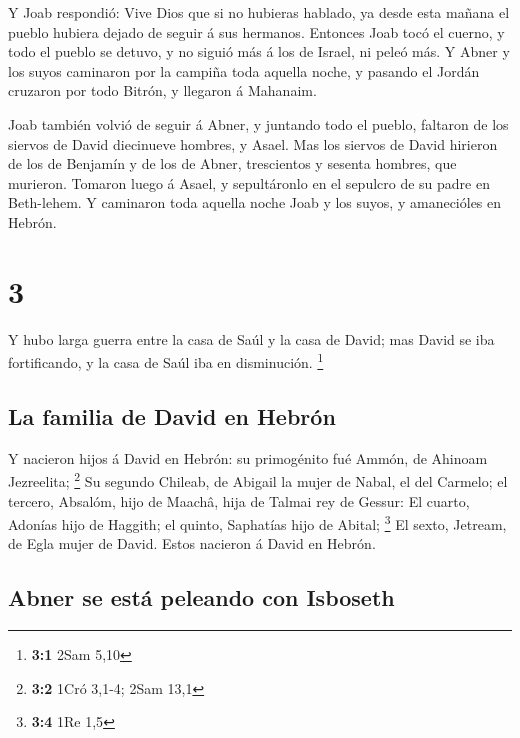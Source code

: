  Y Joab respondió: Vive Dios que si no hubieras hablado,
ya desde esta mañana el pueblo hubiera dejado de seguir á sus hermanos.
 Entonces Joab tocó el cuerno, y todo el pueblo se
detuvo, y no siguió más á los de Israel, ni peleó más.  Y
Abner y los suyos caminaron por la campiña toda aquella noche, y pasando
el Jordán cruzaron por todo Bitrón, y llegaron á Mahanaim.

 Joab también volvió de seguir á Abner, y juntando todo
el pueblo, faltaron de los siervos de David diecinueve hombres, y Asael.
 Mas los siervos de David hirieron de los de Benjamín y
de los de Abner, trescientos y sesenta hombres, que murieron. Tomaron
luego á Asael, y sepultáronlo en el sepulcro de su padre en Beth-lehem.
 Y caminaron toda aquella noche Joab y los suyos, y
amanecióles en Hebrón.

\hypertarget{section-2}{%
\section{3}\label{section-2}}

 Y hubo larga guerra entre la casa de Saúl y la casa de
David; mas David se iba fortificando, y la casa de Saúl iba en
disminución. \footnote{\textbf{3:1} 2Sam 5,10}

\hypertarget{la-familia-de-david-en-hebruxf3n}{%
\subsection{La familia de David en
Hebrón}\label{la-familia-de-david-en-hebruxf3n}}

 Y nacieron hijos á David en Hebrón: su primogénito fué
Ammón, de Ahinoam Jezreelita; \footnote{\textbf{3:2} 1Cró 3,1-4; 2Sam
  13,1}  Su segundo Chileab, de Abigail la mujer de Nabal,
el del Carmelo; el tercero, Absalóm, hijo de Maachâ, hija de Talmai rey
de Gessur:  El cuarto, Adonías hijo de Haggith; el quinto,
Saphatías hijo de Abital; \footnote{\textbf{3:4} 1Re 1,5} 
El sexto, Jetream, de Egla mujer de David. Estos nacieron á David en
Hebrón.

\hypertarget{abner-se-estuxe1-peleando-con-isboseth}{%
\subsection{Abner se está peleando con
Isboseth}\label{abner-se-estuxe1-peleando-con-isboseth}}

